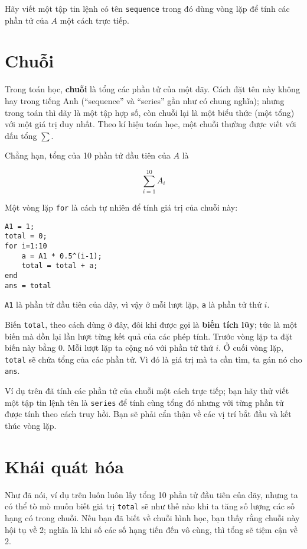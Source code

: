 \documentclass[12pt]{book}
\begin{document}
\begin{ex}
Hãy viết một tập tin lệnh có tên {\tt sequence} trong đó dùng vòng lặp
để tính các phần tử của $A$ một cách trực tiếp.
\end{ex}


\section{Chuỗi}
\label{chuỗi}

Trong toán học, {\bf chuỗi} là tổng các phần tử của một dãy. 
Cách đặt tên này không hay trong tiếng Anh (``sequence'' và 
``series'' gần như có chung nghĩa); nhưng trong toán thì
dãy là một tập hợp số, còn chuỗi lại là một biểu thức (một
tổng) với một giá trị duy nhất. Theo kí hiệu toán học, một
chuỗi thường được viết với dấu tổng $\sum$.

Chẳng hạn, tổng của 10 phần tử đầu tiên của $A$ là

\[ \sum_{i=1}^{10} A_i \]

Một vòng lặp {\tt for} là cách tự nhiên để tính giá trị của
chuỗi này:

\begin{verbatim}
A1 = 1;
total = 0;
for i=1:10
    a = A1 * 0.5^(i-1);
    total = total + a;
end
ans = total
\end{verbatim}

{\tt A1} là phần tử đầu tiên của dãy, vì vậy ở mỗi lượt lặp, 
{\tt a} là phần tử thứ $i$.

Biến {\tt total}, theo cách dùng ở đây, đôi khi được gọi là 
{\bf biến tích lũy}; tức là một biến mà dồn lại lần lượt từng kết quả 
của các phép tính. Trước vòng lặp ta đặt biến này bằng 0.  Mỗi
lượt lặp ta cộng nó với phần tử thứ $i$. Ở cuối vòng lặp, 
{\tt total} sẽ chứa tổng của các phần tử. Vì đó là giá trị mà
ta cần tìm, ta gán nó cho {\tt ans}.

\begin{ex}
Ví dụ trên đã tính các phần tử của chuỗi một cách trực tiếp;
bạn hãy thử viết một tập tin lệnh tên là {\tt series} để tính
cùng tổng đó nhưng với từng phần tử được tính theo cách
truy hồi. Bạn sẽ phải cẩn thận về các vị trí bắt đầu và kết thúc
vòng lặp.
\end{ex}


\section{Khái quát hóa}

Như đã nói, ví dụ trên luôn luôn lấy tổng 10 phần tử đầu tiên
của dãy, nhưng ta có thể tò mò muốn biết giá trị {\tt total}
sẽ như thế nào khi ta tăng số lượng các số hạng có trong chuỗi.
Nếu bạn đã biết về chuỗi hình học, bạn thấy rằng chuỗi này
hội tụ về 2; nghĩa là khi số các số hạng tiến đến vô cùng, thì
tổng sẽ tiệm cận về 2.
\end{document}
